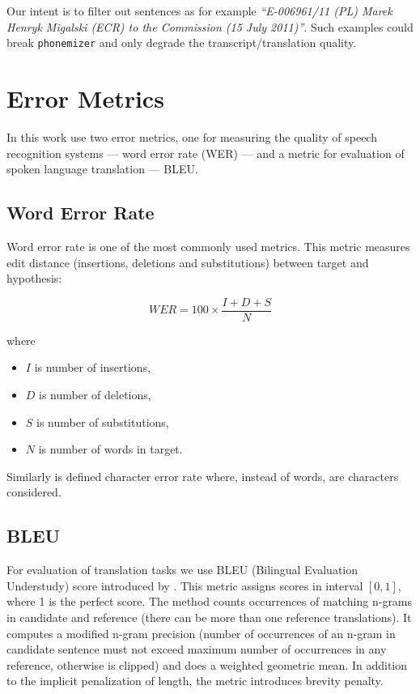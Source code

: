 Our intent is to filter out sentences as for example \textit{``E-006961/11 (PL) Marek Henryk Migalski (ECR) to the Commission (15 July 2011)''}. Such examples could break \texttt{phonemizer} and only degrade the transcript/translation quality.

\section{Error Metrics}
In this work use two error metrics, one for measuring the quality of speech recognition systems --- word error rate (WER) --- and a metric for evaluation of spoken language translation --- BLEU.

\subsection{Word Error Rate}
Word error rate is one of the most commonly used metrics. This metric measures edit distance (insertions, deletions and substitutions) between target and hypothesis:

\begin{equation}
    WER = 100 \times \frac{I + D + S}{N}
\end{equation}

where

\begin{itemize}
    \item $I$ is number of insertions,
    \item $D$ is number of deletions,
    \item $S$ is number of substitutions,
    \item $N$ is number of words in target.
\end{itemize}

Similarly is defined character error rate where, instead of words, are characters considered.

\subsection{BLEU}
For evaluation of translation tasks we use BLEU (Bilingual Evaluation Understudy) score introduced by . This metric assigns scores in interval $[0,1]$, where 1 is the perfect score. The method counts occurrences of matching n-grams in candidate and reference (there can be more than one reference translations). It computes a modified n-gram precision (number of occurrences of an n-gram in candidate sentence must not exceed maximum number of occurrences in any reference, otherwise is clipped) and does a weighted geometric mean. In addition to the implicit penalization of length, the metric introduces brevity penalty.

